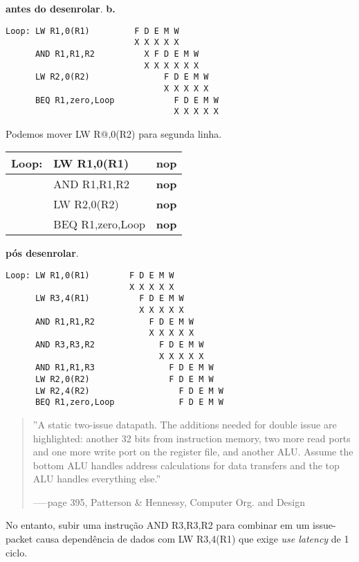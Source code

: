 \documentclass{article}
\begin{document}
\clearpage
\textbf{antes do desenrolar}.
\textbf{b.}

\begin{verbatim}
Loop: LW R1,0(R1)         F D E M W
                          X X X X X
      AND R1,R1,R2          X F D E M W
                            X X X X X X
      LW R2,0(R2)               F D E M W
                                X X X X X
      BEQ R1,zero,Loop            F D E M W
                                  X X X X X
\end{verbatim}

Podemos mover LW R@,0(R2) para segunda linha.

\begin{tabular}{|c|l|l|}
\hline Loop: & LW R1,0(R1) & \textbf{nop} \\
\hline & AND R1,R1,R2 & \textbf{nop} \\
\hline & LW R2,0(R2) & \textbf{nop} \\
\hline & BEQ R1,zero,Loop & \textbf{nop} \\
\hline
\end{tabular}

\clearpage
\textbf{pós desenrolar}.

\begin{verbatim}
Loop: LW R1,0(R1)        F D E M W
                         X X X X X
      LW R3,4(R1)          F D E M W
                           X X X X X
      AND R1,R1,R2           F D E M W
                             X X X X X
      AND R3,R3,R2             F D E M W
                               X X X X X
      AND R1,R1,R3               F D E M W
      LW R2,0(R2)                F D E M W
      LW R2,4(R2)                  F D E M W
      BEQ R1,zero,Loop             F D E M W
\end{verbatim}

\begin{quotation}
''A static two-issue datapath. The additions needed for double issue are
highlighted: another 32 bits from instruction memory, two more read ports and
one more write port on the register file, and another ALU. Assume the bottom ALU
handles address calculations for data transfers and the top ALU handles
everything else.''

\flushright -----page 395, Patterson \& Hennessy, Computer Org. and Design
\end{quotation}

No entanto, subir uma instrução AND R3,R3,R2 para combinar em um issue-packet 
causa dependência de dados com LW R3,4(R1) que exige \textit{use latency} de 1 
ciclo.
\end{document}

